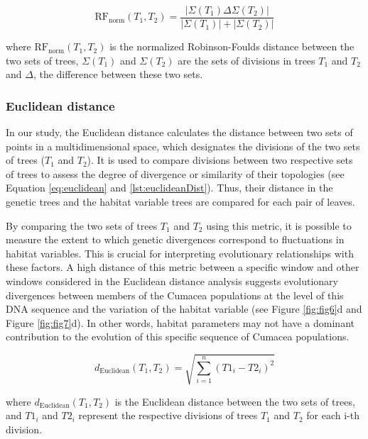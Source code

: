 {\begin{equation}\label{eq:rf_norm}
    \text{RF}_{\text{norm}}(T_1, T_2) = \frac{| \Sigma(T_1) \Delta \Sigma(T_2) |}{| \Sigma(T_1) | + | \Sigma(T_2) |}
\end{equation}

where $ \text{RF}_{\text{norm}}(T_1, T_2)$ is the normalized Robinson-Foulds distance between the two sets of trees, $\Sigma(T_1)$ and $\Sigma(T_2)$ are the sets of divisions in trees $T_1$ and $T_2$ and $ \Delta $, the difference between these two sets.

\subsubsection{Euclidean distance}\label{euclidean}
In our study, the Euclidean distance calculates the distance between two sets of points in a multidimensional space, which designates the divisions of the two sets of trees ($T_1$ and $T_2$). It is used to compare divisions between two respective sets of trees to assess the degree of divergence or similarity of their topologies (see Equation \eqref{eq:euclidean} and \autoref{lst:euclideanDist}). Thus, their distance in the genetic trees and the habitat variable trees are compared for each pair of leaves.

By comparing the two sets of trees $T_1$ and $T_2$ using this metric, it is possible to measure the extent to which genetic divergences correspond to fluctuations in habitat variables. This is crucial for interpreting evolutionary relationships with these factors. A high distance of this metric between a specific window and other windows considered in the Euclidean distance analysis suggests evolutionary divergences between members of the Cumacea populations at the level of this DNA sequence and the variation of the habitat variable (see Figure \ref{fig:fig6}d and Figure \ref{fig:fig7}d). In other words, habitat parameters may not have a dominant contribution to the evolution of this specific sequence of Cumacea populations.

\begin{equation}\label{eq:euclidean}
    d_{\text{Euclidean}}(T_1, T_2) = \sqrt{\sum_{i=1}^{n} (T1_i - T2_i)^2}
\end{equation}

where $ d_{\text{Euclidean}}(T_1, T_2)$ is the Euclidean distance between the two sets of trees, and $T1_i$ and $T2_i$ represent the respective divisions of trees $T_1$ and $T_2$ for each i-th division.

}
